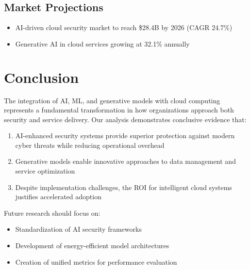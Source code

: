 \documentclass[a4paper,12pt]{article}
\begin{document}
\subsection{Market Projections}
\begin{itemize}
    \item AI-driven cloud security market to reach \$28.4B by 2026 (CAGR 24.7\%)
    \item Generative AI in cloud services growing at 32.1\% annually
\end{itemize}

\section{Conclusion}
The integration of AI, ML, and generative models with cloud computing represents a fundamental transformation in how organizations approach both security and service delivery. Our analysis demonstrates conclusive evidence that:
\begin{enumerate}
    \item AI-enhanced security systems provide superior protection against modern cyber threats while reducing operational overhead
    \item Generative models enable innovative approaches to data management and service optimization
    \item Despite implementation challenges, the ROI for intelligent cloud systems justifies accelerated adoption
\end{enumerate}
Future research should focus on:
\begin{itemize}
    \item Standardization of AI security frameworks
    \item Development of energy-efficient model architectures
    \item Creation of unified metrics for performance evaluation
\end{itemize}

\newpage

\nocite{*}


\end{document}
